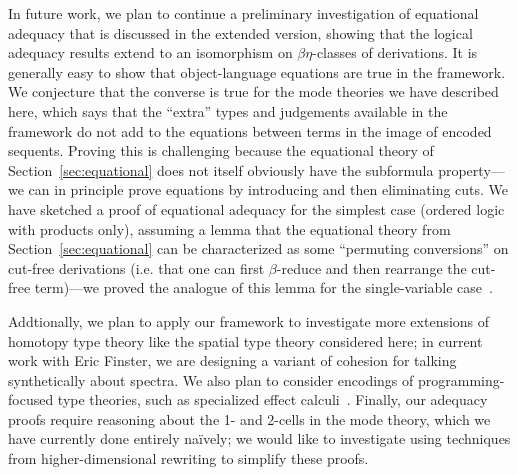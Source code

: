 
In future work, we plan to continue a preliminary investigation of
equational adequacy that is discussed in the extended version, showing
that the logical adequacy results extend to an isomorphism on
$\beta\eta$-classes of derivations.  It is generally easy to show that
object-language equations are true in the framework.  We conjecture that
the converse is true for the mode theories we have described here, which
says that the ``extra'' types and judgements available in the framework
do not add to the equations between terms in the image of encoded
sequents.  Proving this is challenging because the equational theory of
Section~\ref{sec:equational} does not itself obviously have the
subformula property---we can in principle prove equations by introducing
and then eliminating cuts.  We have sketched a proof of equational
adequacy for the simplest case (ordered logic with products only),
assuming a lemma that the equational theory from
Section~\ref{sec:equational} can be characterized as some ``permuting
conversions'' on cut-free derivations (i.e. that one can first
$\beta$-reduce and then rearrange the cut-free term)---we proved the
analogue of this lemma for the single-variable case~\citep{ls16adjoint}.

Addtionally, we plan to apply our framework to investigate more
extensions of homotopy type theory like the spatial type theory
considered here; in current work with Eric Finster, we are designing a
variant of cohesion for talking synthetically about spectra.  We also
plan to consider encodings of programming-focused type theories, such as
specialized effect calculi~\citep{gaboardi16coeffect}.  Finally, our
adequacy proofs require reasoning about the 1- and 2-cells in the mode
theory, which we have currently done entirely na\"ively; we would like
to investigate using techniques from higher-dimensional rewriting to
simplify these proofs.
